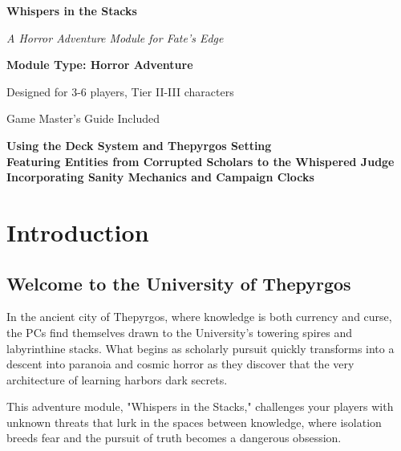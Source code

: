 \documentclass[11pt]{article}
\begin{document}
\begin{titlepage}
\centering
\vspace*{2cm}

{\Huge\bfseries\color{headercolor} Whispers in the Stacks} 

\vspace{0.5cm}

{\Large\itshape A Horror Adventure Module for Fate's Edge}

\vspace{2cm}

\vspace{2cm}

{\Large\bfseries Module Type: Horror Adventure}

\vspace{1cm}

{\large Designed for 3-6 players, Tier II-III characters}

\vspace{1cm}

{\large Game Master's Guide Included}

\vfill

{\large 
\textbf{Using the Deck System and Thepyrgos Setting} \\
\textbf{Featuring Entities from Corrupted Scholars to the Whispered Judge} \\
\textbf{Incorporating Sanity Mechanics and Campaign Clocks}
}

\end{titlepage}

\newpage

\tableofcontents

\newpage

\section{Introduction}

\subsection{Welcome to the University of Thepyrgos}

In the ancient city of Thepyrgos, where knowledge is both currency and curse, the PCs find themselves drawn to the University's towering spires and labyrinthine stacks. What begins as scholarly pursuit quickly transforms into a descent into paranoia and cosmic horror as they discover that the very architecture of learning harbors dark secrets.

This adventure module, "Whispers in the Stacks," challenges your players with unknown threats that lurk in the spaces between knowledge, where isolation breeds fear and the pursuit of truth becomes a dangerous obsession.
\end{document}
